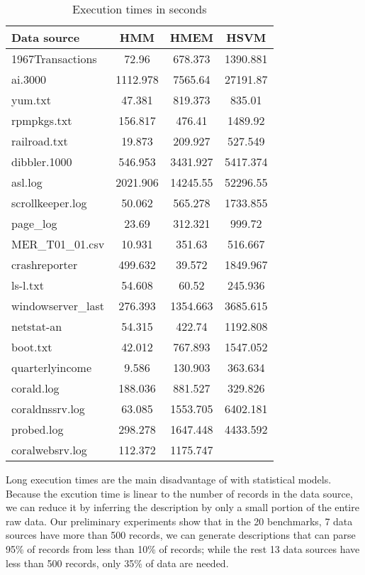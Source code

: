 \begin{table}
\begin{center}
\begin{tabular}{|l||c|c|c|}\hline
Data source & HMM & HMEM & HSVM \\ \hline 
1967Transactions & 72.96 & 678.373 & 1390.881   \\\hline 
ai.3000 & 1112.978 & 7565.64 & 27191.87 \\ \hline
yum.txt & 47.381 &  819.373 & 835.01\\ \hline
rpmpkgs.txt & 156.817 & 476.41 & 1489.92\\ \hline
railroad.txt & 19.873 & 209.927 & 527.549  \\ \hline
dibbler.1000 & 546.953 & 3431.927 & 5417.374   \\ \hline
asl.log & 2021.906 & 14245.55 & 52296.55 \\ \hline
scrollkeeper.log  &  50.062 & 565.278 & 1733.855 \\ \hline
page\_log  & 23.69 & 312.321 & 999.72 \\ \hline
MER\_T01\_01.csv & 10.931 & 351.63 & 516.667 \\ \hline
crashreporter & 499.632 & 39.572 & 1849.967 \\ \hline
ls-l.txt & 54.608 & 60.52 & 245.936 \\ \hline
windowserver\_last & 276.393 & 1354.663 & 3685.615 \\ \hline
netstat-an & 54.315 & 422.74 & 1192.808 \\ \hline
boot.txt & 42.012 &  767.893 & 1547.052 \\ \hline
quarterlyincome & 9.586 & 130.903 & 363.634   \\ \hline
corald.log & 188.036 &  881.527 & 329.826 \\ \hline
coraldnssrv.log  & 63.085 &  1553.705 & 6402.181\\ \hline
probed.log & 298.278 & 1647.448 & 4433.592 \\ \hline
coralwebsrv.log & 112.372 & 1175.747 &  \\\hline
\end{tabular}
\caption{Execution times in seconds}
\label{tab:time}
\end{center}
\end{table}

Long execution times are the main disadvantage of \learnpads{} with
statistical models. Because the excution time is linear to the
number of records in the data source, we can reduce it by inferring
the description by only a small portion of the entire raw data. Our
preliminary experiments show that in the 20 benchmarks, 7 data sources
have more than 500 records, we can generate descriptions that can
parse 95\% of records from less than 10\% of records; while the rest
13 data sources have less than 500 records, only 35\% of data are
needed.

